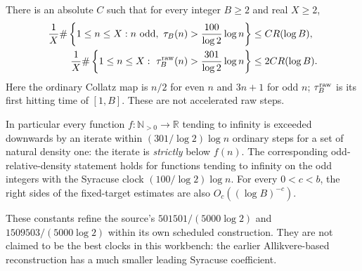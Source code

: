 \begin{theorem}
\label{thm:Mazur-critical-density}
There is an absolute \(C\) such that for every integer \(B\ge2\) and
real \(X\ge2\),
\begin{align}
 \frac1X\#\left\{1\le n\le X:n\text{ odd},\
       \tau_B(n)>\frac{100}{\log2}\log n\right\}
 &\le C R(\log B),\label{eq:Mazur-odd-density}\\
 \frac1X\#\left\{1\le n\le X:\
       \tau_B^{\rm raw}(n)>\frac{301}{\log2}\log n\right\}
 &\le 2C R(\log B).\label{eq:Mazur-raw-density}
\end{align}
Here the ordinary Collatz map is \(n/2\) for even \(n\) and
\(3n+1\) for odd \(n\); \(\tau_B^{\rm raw}\) is its first hitting
time of \([1,B]\). These are not accelerated raw steps.

In particular every function \(f:\mathbb N_{>0}\to\mathbb R\)
tending to infinity is exceeded downwards by an iterate within
\((301/\log2)\log n\) ordinary steps for a set of natural density one:
the iterate is \emph{strictly} below \(f(n)\).
The corresponding odd-relative-density statement holds for functions
tending to infinity on the odd integers with the Syracuse clock
\((100/\log2)\log n\). For every \(0<c<b\), the right sides of the
fixed-target estimates are also \(O_c((\log B)^{-c})\).

These constants refine the source's
\(501501/(5000\log2)\) and \(1509503/(5000\log2)\)
within its own scheduled construction. They are not claimed to be
the best clocks in this workbench: the earlier Allikvere-based
reconstruction has a much smaller leading Syracuse coefficient.
\end{theorem}

